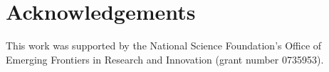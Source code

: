 \documentclass[letterpaper]{article}
\begin{document}
\begin{table}[h]
\vskip 0.25cm
\caption{Estimated total cost. A complete parts list is on our website \citep{WEB}.}
\label{tab:cost}
\end{table}



\section{Acknowledgements}

This work was supported by the National Science Foundation's Office of
Emerging Frontiers in Research and Innovation (grant number 0735953).


\footnotesize


\end{document}
